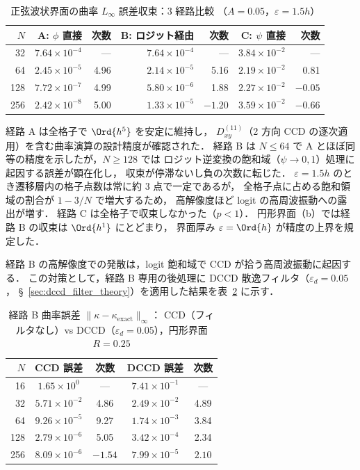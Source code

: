 \begin{table}[htbp]
\centering
\caption{正弦波状界面の曲率 $L_\infty$ 誤差収束：3 経路比較
  （$A = 0.05$，$\varepsilon = 1.5h$）}
\label{tab:curvature_sinusoidal}
\renewcommand{\arraystretch}{1.3}
\begin{tabular}{rrrrrrr}
\toprule
$N$ & A: $\phi$ 直接 & 次数 & B: ロジット経由 & 次数 & C: $\psi$ 直接 & 次数 \\
\midrule
 32 & $7.64 \times 10^{-4}$ & ---  & $7.64 \times 10^{-4}$ & ---  & $3.84 \times 10^{-2}$ & ---  \\
 64 & $2.45 \times 10^{-5}$ & 4.96 & $2.14 \times 10^{-5}$ & 5.16 & $2.19 \times 10^{-2}$ & 0.81 \\
128 & $7.72 \times 10^{-7}$ & 4.99 & $5.80 \times 10^{-6}$ & 1.88 & $2.27 \times 10^{-2}$ & $-0.05$ \\
256 & $2.42 \times 10^{-8}$ & 5.00 & $1.33 \times 10^{-5}$ & $-1.20$ & $3.59 \times 10^{-2}$ & $-0.66$ \\
\bottomrule
\end{tabular}
\end{table}

経路 A は全格子で $\Ord{h^5}$ を安定に維持し，
$D_{xy}^{(11)}$（2 方向 CCD の逐次適用）を含む曲率演算の設計精度が確認された．
経路 B は $N \leq 64$ で A とほぼ同等の精度を示したが，$N \geq 128$ では
ロジット逆変換の飽和域（$\psi \to 0, 1$）処理に起因する誤差が顕在化し，
収束が停滞ないし負の次数に転じた．
$\varepsilon = 1.5h$ のとき遷移層内の格子点数は常に約 3 点で一定であるが，
全格子点に占める飽和領域の割合が $1 - 3/N$ で増大するため，
高解像度ほど logit の高周波振動への露出が増す．
経路 C は全格子で収束しなかった（$p < 1$）．
円形界面（b）では経路 B の収束は $\Ord{h^1}$ にとどまり，
界面厚み $\varepsilon = \Ord{h}$ が精度の上界を規定した．

経路 B の高解像度での発散は，logit 飽和域で CCD が拾う高周波振動に起因する．
この対策として，経路 B 専用の後処理に DCCD 散逸フィルタ（$\varepsilon_d = 0.05$，
§~\ref{sec:dccd_filter_theory}）を適用した結果を表~\ref{tab:curvature_dccd_comparison} に示す．

\begin{table}[htbp]
\centering
\caption{経路 B 曲率誤差 $\|\kappa - \kappa_{\mathrm{exact}}\|_\infty$：
  CCD（フィルタなし）vs DCCD（$\varepsilon_d = 0.05$），円形界面 $R=0.25$}
\label{tab:curvature_dccd_comparison}
\renewcommand{\arraystretch}{1.3}
\begin{tabular}{rcccc}
\toprule
$N$ & CCD 誤差 & 次数 & DCCD 誤差 & 次数 \\
\midrule
 16 & $1.65 \times 10^{0}$  & ---    & $7.41 \times 10^{-1}$ & --- \\
 32 & $5.71 \times 10^{-2}$ & 4.86   & $2.49 \times 10^{-2}$ & 4.89 \\
 64 & $9.26 \times 10^{-5}$ & 9.27   & $1.74 \times 10^{-3}$ & 3.84 \\
128 & $2.79 \times 10^{-6}$ & 5.05   & $3.42 \times 10^{-4}$ & 2.34 \\
256 & $8.09 \times 10^{-6}$ & $-1.54$ & $7.99 \times 10^{-5}$ & $2.10$ \\
\bottomrule
\end{tabular}
\end{table}

